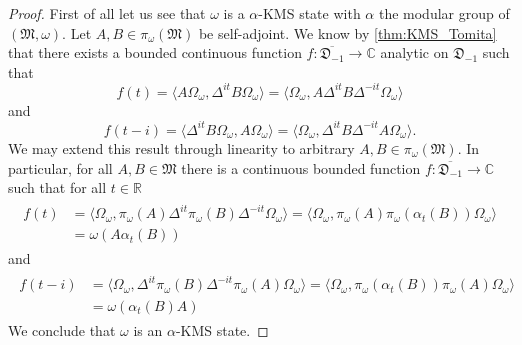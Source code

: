 \begin{proof}
First of all let us see that $\omega$ is a $\alpha$-KMS state with $\alpha$ the modular group of $(\mathfrak{M},\omega)$. Let $A,B\in\pi_\omega(\mathfrak{M})$ be self-adjoint. We know by \ref{thm:KMS_Tomita} that there exists a bounded continuous function $f:\overline{\mathfrak{D}_{-1}}\rightarrow\mathbb{C}$ analytic on $\mathfrak{D}_{-1}$ such that 
\begin{equation}
f(t)=\langle A\Omega_\omega, \Delta^{it}B\Omega_\omega\rangle = \langle\Omega_\omega, A\Delta^{it}B\Delta^{-it}\Omega_\omega\rangle
\end{equation}
and 
\begin{equation}
f(t-i)=\langle \Delta^{it}B\Omega_\omega, A\Omega_\omega\rangle = \langle\Omega_\omega, \Delta^{it}B\Delta^{-it}A\Omega_\omega\rangle.
\end{equation}
We may extend this result through linearity to arbitrary $A,B\in\pi_\omega(\mathfrak{M})$. In particular, for all $A,B\in\mathfrak{M}$ there is a continuous bounded function $f:\overline{\mathfrak{D}_{-1}}\rightarrow\mathbb{C}$ such that for all $t\in\mathbb{R}$
\begin{align}
\begin{split}
f(t)&=\langle\Omega_\omega, \pi_\omega (A)\Delta^{it}\pi_\omega(B)\Delta^{-it}\Omega_\omega\rangle=\langle \Omega_\omega,\pi_\omega(A)\pi_\omega(\alpha_t(B))\Omega_\omega\rangle\\
& = \omega(A\alpha_t(B))
\end{split}
\end{align}
and
\begin{align}
\begin{split}
f(t-i) &=\langle\Omega_\omega, \Delta^{it}\pi_\omega(B)\Delta^{-it}\pi_\omega(A)\Omega_\omega\rangle=\langle \Omega_\omega, \pi_\omega(\alpha_t(B))\pi_\omega(A)\Omega_\omega\rangle \\
&=\omega(\alpha_t(B)A)
\end{split}
\end{align}
We conclude that $\omega$ is an $\alpha$-KMS state.


\end{proof}

